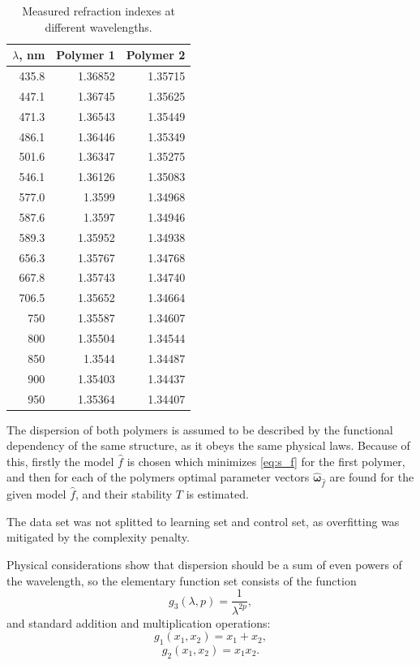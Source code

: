 \documentclass[11pt,a4paper]{article}
\theoremstyle{definition}
\begin{document}
\begin{table}[h]
  \footnotesize
  \caption{Measured refraction indexes at different wavelengths.}
  \centering
  \begin{tabular}{r | r | r}
	$\lambda$, nm	& Polymer 1 & Polymer 2 \\ \hline
	435.8 & 1.36852 & 1.35715 \\
	447.1 & 1.36745 & 1.35625 \\
	471.3 & 1.36543 & 1.35449 \\
	486.1 & 1.36446 & 1.35349 \\
	501.6 & 1.36347 & 1.35275 \\
	546.1 & 1.36126 & 1.35083 \\
	577.0 & 1.3599 & 1.34968 \\
	587.6 & 1.3597 & 1.34946 \\
	589.3 & 1.35952 & 1.34938 \\
	656.3 & 1.35767 & 1.34768 \\
	667.8 & 1.35743 & 1.34740 \\
	706.5 & 1.35652 & 1.34664 \\
	750 & 1.35587 & 1.34607 \\
	800 & 1.35504 & 1.34544 \\
	850 & 1.3544 & 1.34487 \\
	900 & 1.35403 & 1.34437 \\
	950 & 1.35364 & 1.34407 \\
  \end{tabular}
  \label{tabl:source_data}
\end{table}

The dispersion of both polymers is assumed to be described by the functional dependency
of the same structure, as it obeys the same physical laws. Because of this, firstly the
model $\hat{f}$ is chosen which minimizes \eqref{eq:s_f} for the first polymer, and then
for each of the polymers optimal parameter vectors $\hat{\boldsymbol{\omega}}_{\hat{f}}$
are found for the given model $\hat{f}$, and their stability $T$ is estimated.

The data set was not splitted to learning set and control set, as overfitting was
mitigated by the complexity penalty.

Physical considerations show \cite{Serova11} that dispersion should be a sum of even
powers of the wavelength, so the elementary function set consists of the function
\[
  g_3(\lambda, p) = \frac{1}{\lambda^{2p}},
\]
and standard addition and multiplication operations:
\[
  g_1(x_1, x_2) = x_1 + x_2,
\]
\[
  g_2(x_1, x_2) = x_1 x_2.
\]
\end{document}
